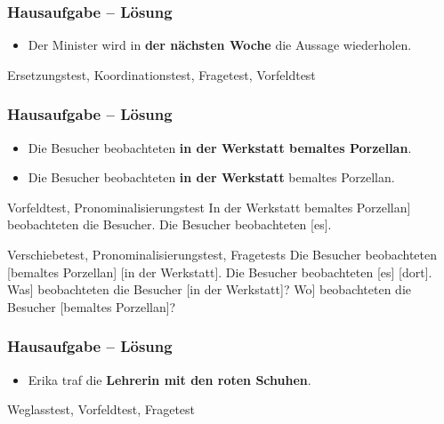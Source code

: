 \begin{frame}
\frametitle{Hausaufgabe -- Lösung}

\begin{itemize}
\item[] Der Minister wird in \textbf{der nächsten Woche} die Aussage wiederholen.
\end{itemize}

\pause 

\ea Ersetzungstest, Koordinationstest, Fragetest, Vorfeldtest \ras {}

\z 
\z

\end{frame}


\begin{frame}
\frametitle{Hausaufgabe -- Lösung}

\begin{itemize}
\item[] Die Besucher beobachteten \textbf{in der Werkstatt bemaltes Porzellan}.

\item[] Die Besucher beobachteten \textbf{in der Werkstatt} bemaltes Porzellan.
\end{itemize}

\pause 

\ea Vorfeldtest, Pronominalisierungstest \ras {} 
\ea {[}In der Werkstatt bemaltes Porzellan{]} beobachteten die Besucher.
\ex Die Besucher beobachteten [es].
\z 

\pause 

\ex Verschiebetest, Pronominalisierungstest, Fragetests \ras {}
\ea Die Besucher beobachteten [bemaltes Porzellan] [in der Werkstatt]. 
\ex Die Besucher beobachteten [es] [dort].
\ex {[}Was{]} beobachteten die Besucher [in der Werkstatt]?
\ex {[}Wo{]} beobachteten die Besucher [bemaltes Porzellan]?
\z
\z

\end{frame}



\begin{frame}
\frametitle{Hausaufgabe -- Lösung}

\begin{itemize}
\item[] Erika traf die \textbf{Lehrerin mit den roten Schuhen}.
\end{itemize}

\pause 

\ea Weglasstest, Vorfeldtest, Fragetest \ras {}
\z 
\z
\end{frame}


